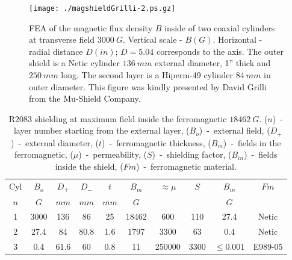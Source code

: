 \documentclass[12pt]{article}
\begin{document}
\begin{figure}[htbp]%
\begin{center}
\texttt{[image: ./magshieldGrilli-2.ps.gz]}
\end{center}
\caption{\small{
FEA of the magnetic flux density $B$ inside of two 
coaxial cylinders at transverse  field $3000~G$. Vertical scale -  $B(G)$. Horizontal 
- radial distance $D(in)$; $D=5.04$ corresponds to the axis.
The outer shield is a Netic cylinder $136~mm$ external diameter, 1'' thick and  
$250~mm$ long. The second layer is a Hiperm-49 cylinder $84~mm$ in outer  diameter. 
This figure was kindly presented by David Grilli from the Mu-Shield Company.}
\label{shieldGrilli}}
\end{figure}
\begin{table}[htbp]
\begin{center}
\begin{tabular}{|c|c|c|c|c|c|c|c|c|c|} \hline
Cyl&$B_{o}$ & $D_+$ & $D_-$ & $t$ & $B_m$& $\approx\mu$&$S$      &$B_{in}$     & $Fm$   \\
$n$ &  $G$  & $mm$  & $mm$  & $mm$  & $G$ &           &         &$G$         &     \\ \hline
1 &3000     &  136  &   86  & 25    & 18462&      600  & 110     & 27.4        & Netic   \\ \hline
2 &27.4     &   84  &   80.8& 1.6   & 1797 &     3300  &  63     & 0.4         & Netic   \\ \hline
3 &0.4      &  61.6 &  60   & 0.8   &  11  &    250000 &3300     &$\leq0.001$  & E989-05 \\ \hline
\end{tabular}
\end{center}
\caption{\small{R2083  shielding  at maximum
field inside  the ferromagnetic $18462~G$.
($n$)~-~layer number starting from the external layer,
($B_{o}$)~-~external field,
($D_+$)~-~external diameter,
($t$)~-~ferromagnetic thickness, %
($B_m$)~-~fields in the ferromagnetic,%
($\mu$)~-~permeability, 
($S$)~-~shielding factor,
($B_{in}$)~-~fields inside the shield,%
($Fm$)~-~ferromagnetic material.
\label{ca001}}}
\end{table}
\end{document}
